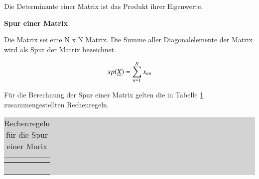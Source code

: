 \noindent Die Determinante einer Matrix ist das Produkt ihrer Eigenwerte. \bigskip

\selectfont
\noindent\textbf{Spur einer Matrix}\smallskip

\noindent Die Matrix  sei eine N x N Matrix. Die Summe aller Diagonalelemente der Matrix wird als Spur der Matrix bezeichnet.

\begin{equation}\label{eq:fifteentwentyfour}
sp(\underline{X}) = \displaystyle\sum\limits_{n=1}^{N} x_{nn}
\end{equation}

\noindent F\"{u}r die Berechnung der Spur einer Matrix gelten die in Tabelle \ref{tab:fifteennine} zusammengestellten Rechenregeln.

\clearpage

\begin{table}[H]
\setlength{\arrayrulewidth}{.1em}
\caption{Rechenregeln f\"{u}r die Spur einer Marix}
\setlength{\fboxsep}{0pt}%
\colorbox{lightgray}{%
%
\begin{tabular}{| c | c |}
\hline
\parbox[c][0.3in][c]{3.2in}{\smallskip\centering\textbf{\selectfont{Bedingung}}} & 
\parbox[c][0.3in][c]{3.2in}{\smallskip\centering\textbf{\selectfont{Mathematische Beschreibung}}}\\ \hline

\parbox[c][0.4in][c]{3.2in}{} &
\parbox[c][0.4in][c]{3.2in}{}\\ \hline

\parbox[c][0.4in][c]{3.2in}{} & 
\parbox[c][0.4in][c]{3.2in}{}\\ \hline

\parbox[c][0.4in][c]{3.2in}{} & 
\parbox[c][0.4in][c]{3.2in}{}\\ \hline

\parbox[c][0.4in][c]{3.2in}{} & 
\parbox[c][0.4in][c]{3.2in}{}\\ \hline

\end{tabular}%
}
\label{tab:fifteennine}
\end{table}

